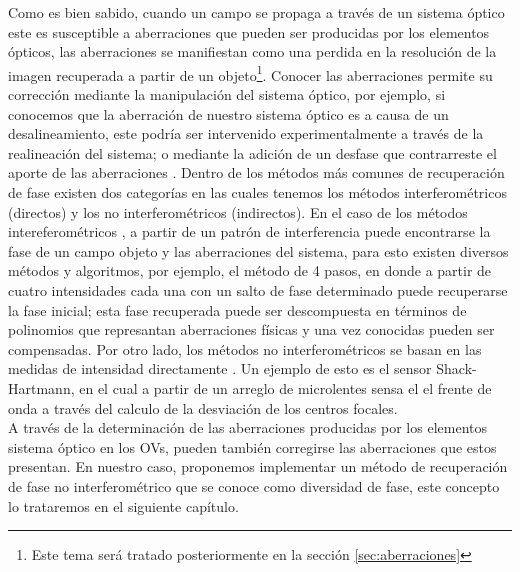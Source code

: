 Como es bien sabido, cuando un campo se propaga a través de un sistema óptico este es susceptible a aberraciones que pueden ser producidas por los elementos ópticos, las aberraciones se manifiestan como una perdida en la resolución de la imagen recuperada a partir de un objeto\footnote{Este tema será tratado posteriormente en la sección \ref{sec:aberraciones}}. Conocer las aberraciones permite su corrección mediante la manipulación del sistema óptico, por ejemplo, si conocemos que la aberración de nuestro sistema óptico es a causa de un desalineamiento, este podría ser intervenido experimentalmente a través de la realineación del sistema; o mediante la adición de un desfase que contrarreste el aporte de las aberraciones \cite{Liesener2004, Cizmar2011}. Dentro de los métodos más comunes de recuperación de fase existen dos categorías en las cuales tenemos los métodos interferométricos (directos) y los no interferométricos (indirectos). En el caso de los métodos intereferométricos \cite{Creath1988, Malacara2007}, a partir de un patrón de interferencia puede encontrarse la fase de un campo objeto y las aberraciones del sistema, para esto existen diversos métodos y algoritmos, por ejemplo, el método de 4 pasos, en donde a partir de cuatro intensidades cada una con un salto de fase determinado puede recuperarse la fase inicial; esta fase recuperada puede ser descompuesta en términos de polinomios que represantan aberraciones físicas y una vez conocidas pueden ser compensadas. Por otro lado, los métodos no interferométricos se basan en las medidas de intensidad directamente \cite{Soloviev2006, Chanan2000}. Un ejemplo de esto es el sensor Shack-Hartmann, en el cual a partir de un arreglo de microlentes sensa el el frente de onda a través del calculo de la desviación de los centros focales.\\

A través de la determinación de las aberraciones producidas por los elementos sistema óptico en los OVs, pueden también corregirse las aberraciones que estos presentan. En nuestro caso, proponemos implementar un método de recuperación de fase no interferométrico que se conoce como diversidad de fase, este concepto lo trataremos en el siguiente capítulo.